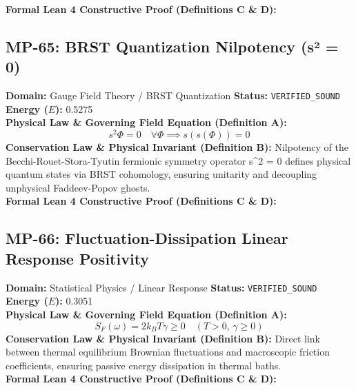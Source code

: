 \textbf{Formal Lean 4 Constructive Proof (Definitions C \& D):}


\vspace{1em}
\subsection{MP-65: BRST Quantization Nilpotency (s² = 0)}
\textbf{Domain:} Gauge Field Theory / BRST Quantization \hfill \textbf{Status:} \texttt{VERIFIED\_SOUND} \hfill \textbf{Energy ($E$):} 0.5275\\
\textbf{Physical Law \& Governing Field Equation (Definition A):}
\begin{equation*}
s^2 \Phi = 0 \quad \forall \Phi \implies s(s(\Phi)) = 0
\end{equation*}
\textbf{Conservation Law \& Physical Invariant (Definition B):}
Nilpotency of the Becchi-Rouet-Stora-Tyutin fermionic symmetry operator s\textasciicircum{}2 = 0 defines physical quantum states via BRST cohomology, ensuring unitarity and decoupling unphysical Faddeev-Popov ghosts.\\

\textbf{Formal Lean 4 Constructive Proof (Definitions C \& D):}


\vspace{1em}
\subsection{MP-66: Fluctuation-Dissipation Linear Response Positivity}
\textbf{Domain:} Statistical Physics / Linear Response \hfill \textbf{Status:} \texttt{VERIFIED\_SOUND} \hfill \textbf{Energy ($E$):} 0.3051\\
\textbf{Physical Law \& Governing Field Equation (Definition A):}
\begin{equation*}
S_F(\omega) = 2 k_B T \gamma \ge 0 \quad (T > 0, \, \gamma \ge 0)
\end{equation*}
\textbf{Conservation Law \& Physical Invariant (Definition B):}
Direct link between thermal equilibrium Brownian fluctuations and macroscopic friction coefficients, ensuring passive energy dissipation in thermal baths.\\

\textbf{Formal Lean 4 Constructive Proof (Definitions C \& D):}


\vspace{1em}
